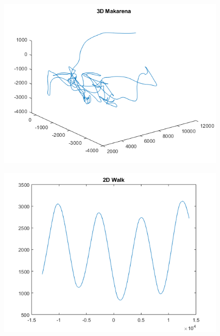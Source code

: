 \documentclass[12pt]{article}
\begin{document}
\begin{enumerate}
\begin{figure}[H]
	\centering
	\includegraphics{makarena_3d.png}
\end{figure}
\noindent

\begin{figure}[H]
	\centering
	\includegraphics{walk_2d.png}
\end{figure}
\noindent


\end{enumerate}
\end{document}
